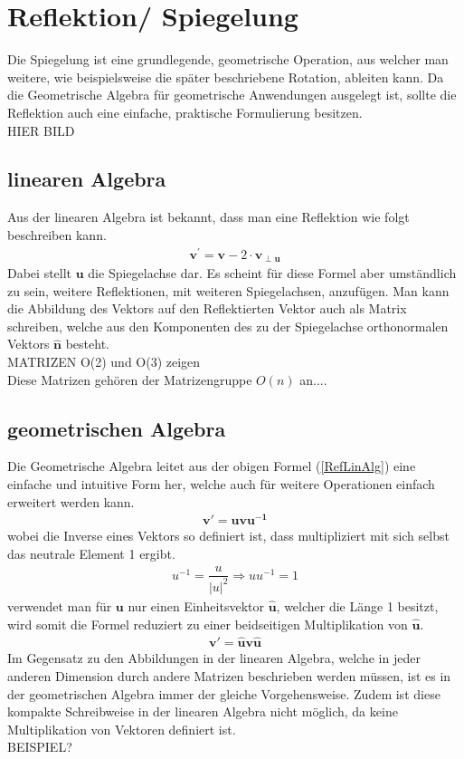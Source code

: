 %
%
%
\section{Reflektion/ Spiegelung}
Die Spiegelung ist eine grundlegende, geometrische Operation, aus welcher man weitere, wie beispielsweise die später beschriebene Rotation, ableiten kann. Da die Geometrische Algebra für geometrische Anwendungen ausgelegt ist, sollte die Reflektion auch eine einfache, praktische Formulierung besitzen. \\HIER BILD
\subsection{linearen Algebra}
Aus der linearen Algebra ist bekannt, dass man eine Reflektion wie folgt beschreiben kann.
\begin{align} \label{RefLinAlg}
	\mathbf{v^{'}} = \mathbf{v} - 2 \cdot \mathbf{v_{\perp u}}
\end{align}
Dabei stellt $\mathbf{u}$ die Spiegelachse dar.
Es scheint für diese Formel aber umständlich zu sein, weitere Reflektionen, mit weiteren Spiegelachsen, anzufügen. Man kann die Abbildung des Vektors auf den Reflektierten Vektor auch als Matrix schreiben, welche aus den Komponenten des zu der Spiegelachse orthonormalen Vektors $\mathbf{\hat{n}}$ besteht.
\\MATRIZEN O(2) und O(3) zeigen\\
Diese Matrizen gehören der Matrizengruppe $O(n)$ an....
\subsection{geometrischen Algebra}
Die Geometrische Algebra leitet aus der obigen Formel (\ref{RefLinAlg}) eine einfache und intuitive Form her, welche auch für weitere Operationen einfach erweitert werden kann.
\begin{align}
	\mathbf{v'} = \mathbf{uvu^{-1}}
\end{align}
wobei die Inverse eines Vektors so definiert ist, dass multipliziert mit sich selbst das neutrale Element 1 ergibt.
\begin{align}
	u^{-1} = \dfrac{u}{|u|^2} \Rightarrow uu^{-1} = 1
\end{align}
verwendet man für $\mathbf{u}$ nur einen Einheitsvektor $\mathbf{\hat{u}}$, welcher die Länge 1 besitzt, wird somit die Formel reduziert zu einer beidseitigen Multiplikation von $\mathbf{\hat{u}}$.
\begin{align}
	\mathbf{v'} = \mathbf{\hat{u}v\hat{u}}
\end{align}
Im Gegensatz zu den Abbildungen in der linearen Algebra, welche in jeder anderen Dimension durch andere Matrizen beschrieben werden müssen, ist es in der geometrischen Algebra immer der gleiche Vorgehensweise.
Zudem ist diese kompakte Schreibweise in der linearen Algebra nicht möglich, da keine Multiplikation von Vektoren definiert ist. 
\\BEISPIEL?